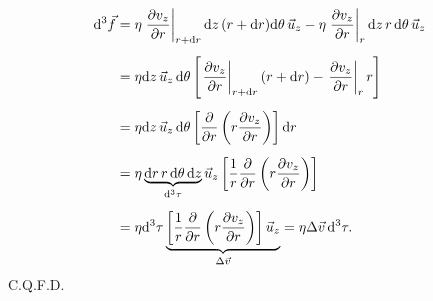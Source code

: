 \documentclass[11pt,a4paper]{article}
\newcommand{\dd}{\mathrm d}
\newcommand{\pd}[2]{\frac{\partial #1}{\partial #2}}
\begin{document}
\begin{align*}
\dd^3\vec f
&=\eta\left.\pd{v_z}r\right|_{r+\dd r}\dd z\,(r+\dd r)\dd\theta\,\uz-\eta\left.\pd{v_z}r\right|_r\dd z\,r\,\dd\theta\,\uz\\[5pt]
&=\eta\dd z\,\uz\,\dd\theta\left[\left.\pd{v_z}r\right|_{r+\dd r}(r+\dd r)-\left.\pd{v_z}r\right|_r r\right]\\[5pt]
&=\eta\dd z\,\uz\,\dd\theta\left[\frac\partial{\partial r}\left(r\pd{v_z}r\right)\right]\dd r\\[5pt]
&=\eta\underbrace{\dd r\,r\,\dd\theta\,\dd z}_{\dd^3\tau}\uz\left[\frac1r\frac\partial{\partial r}\left(r\pd{v_z}r\right)\right]\\[5pt]
&=\eta\dd^3\tau\underbrace{\left[\frac1r\frac\partial{\partial r}\left(r\pd{v_z}r\right)\right]\uz}_{\Delta\vec v}
=\eta\Delta\vec v\,\dd^3\tau.
\end{align*}
C.Q.F.D.
\end{document}
